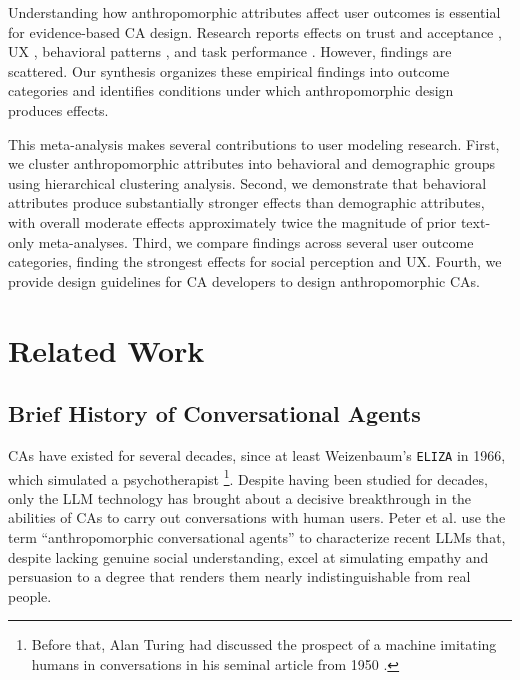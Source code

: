 \documentclass[sigconf,review,anonymous]{acmart}
\begin{document}
Understanding how anthropomorphic attributes affect user outcomes is essential for evidence-based CA design. Research reports effects on trust and acceptance \citep{kraus_role_2021,chandra_be_2022}, UX \citep{lieb_student_2024,liu_older_2023}, behavioral patterns \citep{mehra_chatbot_2021,chen_you_2021}, and task performance \citep{zheldibayeva_genai_2025,baihaqi_rapport-driven_2024}. However, findings are scattered. Our synthesis organizes these empirical findings into outcome categories and identifies conditions under which anthropomorphic design produces effects.

This meta-analysis makes several contributions to user modeling research. First, we cluster anthropomorphic attributes into behavioral and demographic groups using hierarchical clustering analysis. Second, we demonstrate that behavioral attributes produce substantially stronger effects than demographic attributes, with overall moderate effects approximately twice the magnitude of prior text-only meta-analyses. Third, we compare findings across several user outcome categories, finding the strongest effects for social perception and UX. Fourth, we provide design guidelines for CA developers to design anthropomorphic CAs.

\section{Related Work}

\subsection{Brief History of Conversational Agents}
CAs have existed for several decades, since at least Weizenbaum's \texttt{ELIZA} in 1966, which simulated a psychotherapist \citep{weizenbaum_elizacomputer_1966}\footnote{Before that, Alan Turing had discussed the prospect of a machine imitating humans in conversations in his seminal article from 1950 \citep{turing_computing_1950}.}. Despite having been studied for decades, only the LLM technology has brought about a decisive breakthrough in the abilities of CAs to carry out conversations with human users. Peter et al. \cite{peter_benefits_2025} use the term ``anthropomorphic conversational agents'' to characterize recent LLMs that, despite lacking genuine social understanding, excel at simulating empathy and persuasion to a degree that renders them nearly indistinguishable from real people. %
\end{document}
